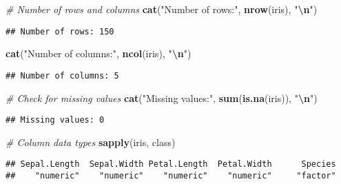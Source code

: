 \documentclass[
]{article}
\newenvironment{Shaded}{\begin{snugshade}}{\end{snugshade}}
\newcommand{\CommentTok}[1]{\textcolor[rgb]{0.56,0.35,0.01}{\textit{#1}}}
\newcommand{\FunctionTok}[1]{\textcolor[rgb]{0.13,0.29,0.53}{\textbf{#1}}}
\newcommand{\NormalTok}[1]{#1}
\newcommand{\SpecialCharTok}[1]{\textcolor[rgb]{0.81,0.36,0.00}{\textbf{#1}}}
\newcommand{\StringTok}[1]{\textcolor[rgb]{0.31,0.60,0.02}{#1}}
\begin{document}
\begin{Shaded}
\begin{Highlighting}[]
\CommentTok{\# Number of rows and columns}
\FunctionTok{cat}\NormalTok{(}\StringTok{"Number of rows:"}\NormalTok{, }\FunctionTok{nrow}\NormalTok{(iris), }\StringTok{"}\SpecialCharTok{\textbackslash{}n}\StringTok{"}\NormalTok{)}
\end{Highlighting}
\end{Shaded}

\begin{verbatim}
## Number of rows: 150
\end{verbatim}

\begin{Shaded}
\begin{Highlighting}[]
\FunctionTok{cat}\NormalTok{(}\StringTok{"Number of columns:"}\NormalTok{, }\FunctionTok{ncol}\NormalTok{(iris), }\StringTok{"}\SpecialCharTok{\textbackslash{}n}\StringTok{"}\NormalTok{)}
\end{Highlighting}
\end{Shaded}

\begin{verbatim}
## Number of columns: 5
\end{verbatim}

\begin{Shaded}
\begin{Highlighting}[]
\CommentTok{\# Check for missing values}
\FunctionTok{cat}\NormalTok{(}\StringTok{"Missing values:"}\NormalTok{, }\FunctionTok{sum}\NormalTok{(}\FunctionTok{is.na}\NormalTok{(iris)), }\StringTok{"}\SpecialCharTok{\textbackslash{}n}\StringTok{"}\NormalTok{)}
\end{Highlighting}
\end{Shaded}

\begin{verbatim}
## Missing values: 0
\end{verbatim}

\begin{Shaded}
\begin{Highlighting}[]
\CommentTok{\# Column data types}
\FunctionTok{sapply}\NormalTok{(iris, class)}
\end{Highlighting}
\end{Shaded}

\begin{verbatim}
## Sepal.Length  Sepal.Width Petal.Length  Petal.Width      Species 
##    "numeric"    "numeric"    "numeric"    "numeric"     "factor"
\end{verbatim}
\end{document}
